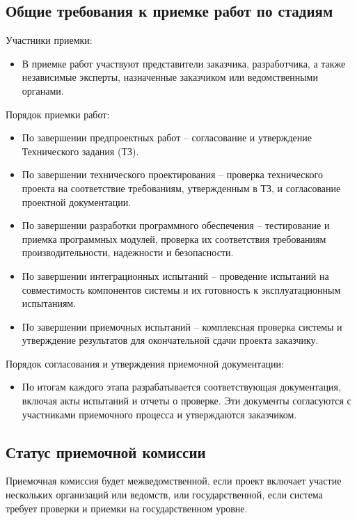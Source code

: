 \subsection{Общие требования к приемке работ по стадиям}
\noindent Участники приемки:
\begin{itemize}
    \item В приемке работ участвуют представители заказчика, разработчика, а также независимые эксперты, назначенные заказчиком или ведомственными органами.
\end{itemize}

\noindent Порядок приемки работ:
\begin{itemize}
    \item По завершении предпроектных работ -- согласование и утверждение
    Технического задания (ТЗ).
    \item По завершении технического проектирования -- проверка технического проекта на
    соответствие требованиям, утвержденным в ТЗ, и согласование проектной
    документации.
    \item По завершении разработки программного обеспечения -- тестирование и
    приемка программных модулей, проверка их соответствия требованиям
    производительности, надежности и безопасности.
    \item По завершении интеграционных испытаний -- проведение испытаний на
    совместимость компонентов системы и их готовность к эксплуатационным
    испытаниям.
    \item По завершении приемочных испытаний -- комплексная проверка системы и
    утверждение результатов для окончательной сдачи проекта заказчику.
\end{itemize}

\noindent Порядок согласования и утверждения приемочной документации:
\begin{itemize}
    \item По итогам каждого этапа разрабатывается соответствующая документация,
    включая акты испытаний и отчеты о проверке. Эти документы согласуются с
    участниками приемочного процесса и утверждаются заказчиком.
\end{itemize}

\subsection{Статус приемочной комиссии}
Приемочная комиссия будет межведомственной, если проект включает участие
нескольких организаций или ведомств, или государственной, если система требует
проверки и приемки на государственном уровне.

